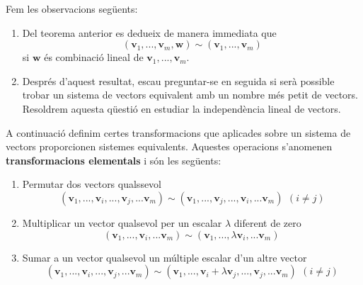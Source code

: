 \begin{observacio}
Fem les observacions següents:

\begin{enumerate}
\item Del teorema anterior es dedueix de manera immediata que%
\begin{equation*}
\left( \mathbf{v}_{1},...,\mathbf{v}_{m},\mathbf{w}\right) \sim (\mathbf{v}%
_{1},...,\mathbf{v}_{m})
\end{equation*}%
si $\mathbf{w}$ és combinació lineal de $\mathbf{v}_{1},...,\mathbf{v}%
_{m}$.

\item Després d’aquest resultat, escau preguntar-se en seguida si serà
possible trobar un sistema de vectors equivalent amb un nombre més petit
de vectors. Resoldrem aquesta qüestió en estudiar la independència
lineal de vectors.
\end{enumerate}
\end{observacio}

\begin{definicio}
A continuació definim certes transformacions que aplicades sobre un
sistema de vectors proporcionen sistemes equivalents. Aquestes operacions s'anomenen \textbf{transformacions elementals} i són les següents:

\begin{enumerate}
\item[T1:] Permutar dos vectors qualssevol%
\begin{equation*}
\left( \mathbf{v}_{1},...,\mathbf{v}_{i},...,\mathbf{v}_{j},...\mathbf{v}%
_{m}\right) \sim \left( \mathbf{v}_{1},...,\mathbf{v}_{j},...,\mathbf{v}%
_{i},...\mathbf{v}_{m}\right) \,\ (i\neq j)
\end{equation*}

\item[T2:] Multiplicar un vector qualsevol per un escalar $\lambda $
diferent de zero%
\begin{equation*}
\left( \mathbf{v}_{1},...,\mathbf{v}_{i},...\mathbf{v}_{m}\right) \sim
\left( \mathbf{v}_{1},...,\lambda \mathbf{v}_{i},...\mathbf{v}_{m}\right) \,
\end{equation*}

\item[T3:] Sumar a un vector qualsevol un múltiple escalar d’un altre
vector%
\begin{equation*}
\left( \mathbf{v}_{1},...,\mathbf{v}_{i},...,\mathbf{v}_{j},...\mathbf{v}%
_{m}\right) \sim \left( \mathbf{v}_{1},...,\mathbf{v}_{i}+\lambda \mathbf{v}%
_{j},...,\mathbf{v}_{j},...\mathbf{v}_{m}\right) \,\ (i\neq j)
\end{equation*}
\end{enumerate}
\end{definicio}

